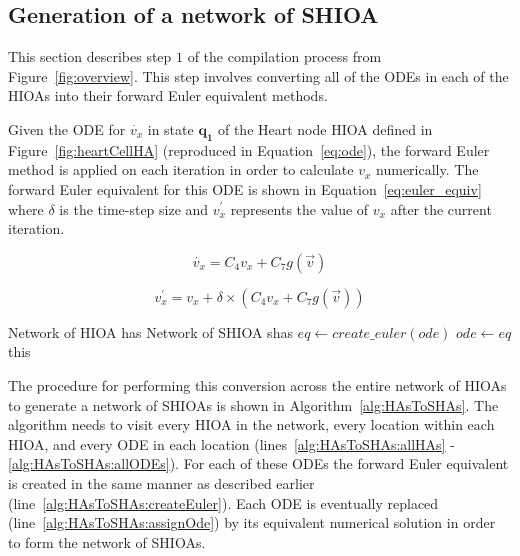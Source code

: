 \subsection{Generation of a network of \ac{SHIOA}}
\label{sec:shaGeneration}

This section describes step $1$ of the compilation process from
Figure~\ref{fig:overview}.  This step involves converting all of the
\acp{ODE} in each of the \acp{HIOA} into their forward Euler equivalent
methods.

Given the \ac{ODE} for $\dot{v_x}$ in state $\mathbf{q_1}$ of the Heart
node \ac{HIOA} defined in Figure~\ref{fig:heartCellHA} (reproduced in
Equation~\ref{eq:ode}), the forward Euler method is applied on each
iteration in order to calculate $v_x$ numerically.  The forward Euler
equivalent for this ODE is shown in Equation~\ref{eq:euler_equiv} where
$\delta$ is the time-step size and $v^\prime_x$ represents the value of
$v_x$ after the current iteration.

\begin{equation}
  \dot{v_x} = C_{4} v_x + C_{7} g(\vec{v})
  \label{eq:ode}
\end{equation}

\begin{equation}
  v^\prime_x = v_x + \delta \times (C_{4} v_x + C_{7} g(\vec{v}))
  \label{eq:euler_equiv}
\end{equation}

\renewcommand{\algorithmiccomment}[1]{// #1}
\renewcommand{\algorithmicrequire}{\textbf{Input:}}
\renewcommand{\algorithmicensure}{\textbf{Output:}}
\begin{algorithm}[t!]
  \begin{algorithmic}[1]
    \REQUIRE Network of HIOA has 
    \ENSURE Network of SHIOA shas
     \label{alg:HAsToSHAs:allHAs}
      \label{alg:HAsToSHAs:allLocs}
     \label{alg:HAsToSHAs:allODEs}
    \STATE $eq \leftarrow create\_euler(ode)$ \label{alg:HAsToSHAs:createEuler}
    \STATE $ode \leftarrow eq$ \label{alg:HAsToSHAs:assignOde}
    \ENDFOR
    \ENDFOR
    \ENDFOR
    \RETURN this
  \end{algorithmic}
  \caption{The algorithm to generate a Network of \acp{SHIOA} from a Network of \acp{HIOA}}
  \label{alg:HAsToSHAs}
\end{algorithm}

The procedure for performing this conversion across the entire network
of \acp{HIOA} to generate a network of \acp{SHIOA} is shown in
Algorithm~\ref{alg:HAsToSHAs}.  The algorithm needs to visit every
\ac{HIOA} in the network, every location within each \ac{HIOA}, and
every \ac{ODE} in each location (lines~\ref{alg:HAsToSHAs:allHAs} -
\ref{alg:HAsToSHAs:allODEs}).  For each of these \acp{ODE} the forward
Euler equivalent is created in the same manner as described earlier
(line~\ref{alg:HAsToSHAs:createEuler}).  Each \ac{ODE} is eventually
replaced (line~\ref{alg:HAsToSHAs:assignOde}) by its equivalent
numerical solution in order to form the network of \acp{SHIOA}.


